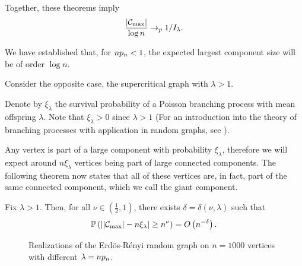 Together, these theorems imply
\begin{equation}
	\frac{|\mathcal{C}_{\max}|}{\log n} \rightarrow_p 1/I_{\lambda}.
\end{equation}

We have established that, for $n p_n < 1$, the expected largest component size will be of order $\log n$.

Consider the opposite case, the supercritical graph with $\lambda > 1$. 

Denote by $\xi_\lambda$ the survival probability of a Poisson branching process with mean offspring $\lambda$.
Note that $\xi_\lambda > 0$ since $\lambda > 1$
(For an introduction into the theory of branching processes with application in random graphs, 
see \cite[Chapter 3, p.87ff.]{vanderHofstad.2016}).

Any vertex is part of a large component with probability $\xi_\lambda$, 
therefore we will expect around $n \xi_\lambda$ vertices being part of large connected components.
The following theorem now states that all of these vertices are, in fact, part of the same connected component, which we call the giant component.

\begin{theorem}
	Fix $\lambda>1$.
	Then, for all $\nu \in (\frac{1}{2}, 1)$, there exists $\delta = \delta(\nu, \lambda)$ such that
	\begin{equation}
		\mathbb{P}\left( \left| |\mathcal{C}_{\max}| - n \xi_\lambda \right| \geq n^{\nu}\right) = O\left(n^{-\delta}\right).
	\end{equation}
\end{theorem}

\begin{figure}[h]
	\centering
	\quad
	\caption{Realizations of the Erdös-Rényi random graph on $n=1000$ vertices with different $\lambda = n p_n$.}%
	\label{F: ER lambda}%
\end{figure}

